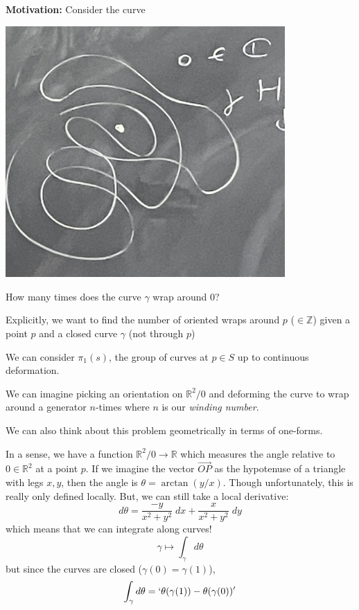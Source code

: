 \documentclass[12pt]{article}
\newcommand{\R}{\mathbb{R}}
\newcommand{\Z}{\mathbb{Z}}
\begin{document}
    \textbf{Motivation:} Consider the curve 
    \begin{center}
        \includegraphics[width=0.8\textwidth]{Images/April 24 - Winding curve}
    \end{center}

    How many times does the curve $\gamma$ wrap around $0$? 

    Explicitly, we want to find the number of oriented wraps around $p$ ($\in \Z$) given a point $p$ and a closed curve $\gamma$ (not through $p$)

    We can consider $\pi_1(s)$, the group of curves at $p \in S$ up to continuous deformation.

    We can imagine picking an orientation on $\R^2/0$ and deforming the curve to wrap around a generator $n$-times where $n$ is our \emph{winding number}. 

    We can also think about this problem geometrically in terms of one-forms. 

    In a sense, we have a function $\R^2/0 \to \R$ which measures the angle relative to $0 \in \R^2$ at a point $p$. If we imagine the vector $\vec{OP}$ as the hypotenuse of a triangle with legs $x, y$, then the angle is $\theta = \arctan(y/x)$. Though unfortunately, this is really only defined locally. But, we can still take a local derivative: 
    \[d\theta = \frac{-y}{x^2 + y^2}\; dx + \frac{x}{x^2 + y^2} \; dy\] 
    which means that we can integrate along curves!
    \[\gamma \mapsto \int_{\gamma} d\theta\]
    but since the curves are closed ($\gamma(0) = \gamma(1)$), 
    \[\int_{\gamma} d\theta = `\theta(\gamma(1)) - \theta(\gamma(0))'\]
\end{document}
